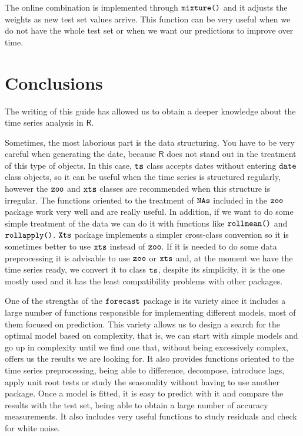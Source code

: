 \documentclass[12pt,a4paper,oneside]{article}
\begin{document}
The online combination is implemented through $\verb!mixture()!$ and it adjusts the weights as new test set values arrive. This function can be very useful when we do not have the whole test set or when we want our predictions to improve over time.

\section*{Conclusions}
The writing of this guide has allowed us to obtain a deeper knowledge about the time series analysis in $\textsf{R}$.

Sometimes, the most laborious part is the data structuring. You have to be very careful when generating the date, because $\textsf{R}$ does not stand out in the treatment of this type of objects. In this case, $\verb!ts!$ class accepts dates without entering $\verb!date!$ class objects, so it can be useful when the time series is structured regularly, however the $\verb!zoo!$ and $\verb!xts!$ classes are recommended when this structure is irregular. The functions oriented to the treatment of $\verb!NAs!$ included in the $\verb!zoo!$ package work very well and are really useful. In addition, if we want to do some simple treatment of the data we can do it with functions like $\verb!rollmean()!$ and $\verb!rollapply()!$. $\verb!Xts!$ package implements a simpler cross-class conversion so it is sometimes better to use $\verb!xts!$ instead of $\verb!zoo!$. If it is needed to do some data preprocessing it is advisable to use $\verb!zoo!$ or $\verb!xts!$ and, at the moment we have the time series ready, we convert it to class $\verb!ts!$, despite its simplicity, it is the one mostly used and it has the least compatibility problems with other packages.

One of the strengths of the $\verb!forecast!$ package is its variety since it includes a large number of functions responsible for implementing different models, most of them focused on prediction. This variety allows us to design a search for the optimal model based on complexity, that is, we can start with simple models and go up in complexity until we find one that, without being excessively complex, offers us the results we are looking for. It also provides functions oriented to the time series preprocessing, being able to difference, decompose, introduce lags, apply unit root tests or study the seasonality without having to use another package. Once a model is fitted, it is easy to predict with it and compare the results with the test set, being able to obtain a large number of accuracy measurements. It also includes very useful functions to study residuals and check for white noise.
\end{document}
